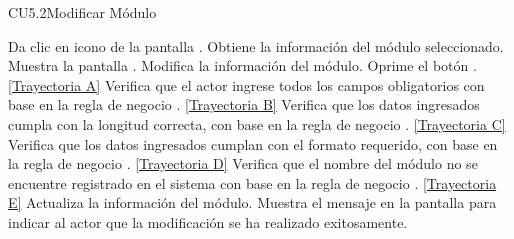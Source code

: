\begin{UseCase}{CU5.2}{Modificar Módulo}
{		}
	\end{UseCase}
	\begin{UCtrayectoria}
		\UCpaso[\UCactor] Da clic en icono \editar de la pantalla .
		\UCpaso[\UCsist] Obtiene la información del módulo seleccionado.
		\UCpaso[\UCsist] Muestra la pantalla .
		\UCpaso[\UCactor] Modifica la información del módulo. \label{CU5.2-P4}
		\UCpaso[\UCactor] Oprime el botón . \hyperlink{CU5-2:TAA}{[Trayectoria A]}
		\UCpaso[\UCsist] Verifica que el actor ingrese todos los campos obligatorios con base en la regla de negocio . \hyperlink{CU5-2:TAB}{[Trayectoria B]}
		\UCpaso[\UCsist] Verifica que los datos ingresados cumpla con la longitud correcta, con base en la regla de negocio . \hyperlink{CU5-2:TAC}{[Trayectoria C]}
		\UCpaso[\UCsist] Verifica que los datos ingresados cumplan con el formato requerido, con base en la regla de negocio . \hyperlink{CU5-2:TAD}{[Trayectoria D]}
		\UCpaso[\UCsist] Verifica que el nombre del módulo no se encuentre registrado en el sistema con base en la regla de negocio . \hyperlink{CU5-2:TAE}{[Trayectoria E]}
		\UCpaso[\UCsist] Actualiza la información del módulo.
		\UCpaso[\UCsist] Muestra el mensaje  en la pantalla  para indicar al actor que la modificación se ha realizado exitosamente.
	\end{UCtrayectoria}		
	
